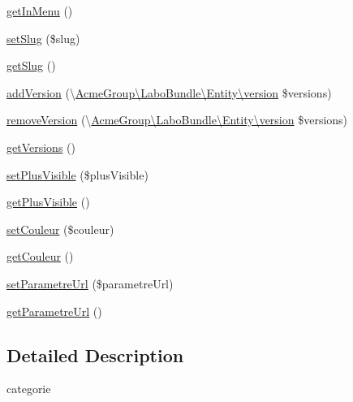 \begin{DoxyCompactItemize}
\hyperlink{class_acme_group_1_1_labo_bundle_1_1_entity_1_1categorie_a4b25acc38ada9d5460f1018e6b7cd18b}{get\+In\+Menu} ()
\item 
\hyperlink{class_acme_group_1_1_labo_bundle_1_1_entity_1_1categorie_aebc33fb30ae7badb1615b16093b75ae3}{set\+Slug} (\$slug)
\item 
\hyperlink{class_acme_group_1_1_labo_bundle_1_1_entity_1_1categorie_a795669dff0d904ab27ef48fe969aaec2}{get\+Slug} ()
\item 
\hyperlink{class_acme_group_1_1_labo_bundle_1_1_entity_1_1categorie_a0a295f4d56301fb6306dfd99df6a8b97}{add\+Version} (\textbackslash{}\hyperlink{class_acme_group_1_1_labo_bundle_1_1_entity_1_1version}{Acme\+Group\textbackslash{}\+Labo\+Bundle\textbackslash{}\+Entity\textbackslash{}version} \$versions)
\item 
\hyperlink{class_acme_group_1_1_labo_bundle_1_1_entity_1_1categorie_a2e60bb98aafb952bb501de877a51ce00}{remove\+Version} (\textbackslash{}\hyperlink{class_acme_group_1_1_labo_bundle_1_1_entity_1_1version}{Acme\+Group\textbackslash{}\+Labo\+Bundle\textbackslash{}\+Entity\textbackslash{}version} \$versions)
\item 
\hyperlink{class_acme_group_1_1_labo_bundle_1_1_entity_1_1categorie_aaaff81129fec776b8a9e5ec6e80dfd7d}{get\+Versions} ()
\item 
\hyperlink{class_acme_group_1_1_labo_bundle_1_1_entity_1_1categorie_a76fbae84c3656e9e2aff5523741f1a3a}{set\+Plus\+Visible} (\$plus\+Visible)
\item 
\hyperlink{class_acme_group_1_1_labo_bundle_1_1_entity_1_1categorie_a3042310e0a937aad1426c5f416edbe3c}{get\+Plus\+Visible} ()
\item 
\hyperlink{class_acme_group_1_1_labo_bundle_1_1_entity_1_1categorie_a085087d3cfc5a30fbdc906cbe8499d49}{set\+Couleur} (\$couleur)
\item 
\hyperlink{class_acme_group_1_1_labo_bundle_1_1_entity_1_1categorie_a8d487856ec92498214fa254840493023}{get\+Couleur} ()
\item 
\hyperlink{class_acme_group_1_1_labo_bundle_1_1_entity_1_1categorie_a1d8bd24998d8114362ec3ee837ebf24c}{set\+Parametre\+Url} (\$parametre\+Url)
\item 
\hyperlink{class_acme_group_1_1_labo_bundle_1_1_entity_1_1categorie_a4fd28536ffa25177a74db5869e649776}{get\+Parametre\+Url} ()
\end{DoxyCompactItemize}


\subsection{Detailed Description}
categorie

